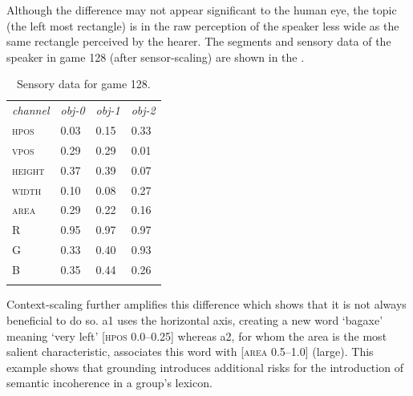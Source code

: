 Although the difference may not appear significant to 
the human eye, the topic (the left most rectangle) is 
in the raw perception of the speaker less wide as the same 
rectangle perceived by the hearer. 
The segments and sensory data of the speaker
in game 128 (after sensor-scaling) are shown in the 
. 

\begin{table}
\begin{center}
\begin{tabular}{llll}
\lsptoprule
{\itshape channel}& {\itshape obj-0} & {\itshape obj-1} & {\itshape obj-2}\\ 
\textsc{hpos} & 0.03 & 0.15 & 0.33\\ 
\textsc{vpos} & 0.29 & 0.29 & 0.01\\ 
\textsc{height} & 0.37 & 0.39 & 0.07\\ 
\textsc{width} & 0.10 & 0.08 & 0.27\\ 
\textsc{area} & 0.29 & 0.22 & 0.16\\ 
R & 0.95 & 0.97 & 0.97 \\ 
G & 0.33 & 0.40 & 0.93\\ 
B & 0.35 & 0.44 & 0.26\\ 
\lspbottomrule
\end{tabular}
\caption{\label{tab:game128}Sensory data for game 128.}
\end{center}
\end{table}
Context-scaling further
amplifies this difference which shows that it is not 
always beneficial to do so. {\bfshape a1} uses
the horizontal axis, creating a new word `bagaxe' 
meaning `very left' [\textsc{hpos} 0.0–0.25] whereas {\bfshape a2}, for
whom the area is the most salient characteristic, 
associates this word with [\textsc{area} 0.5–1.0] (large). 
This example shows that grounding introduces 
additional risks for the introduction of semantic
incoherence in a group's lexicon. 

